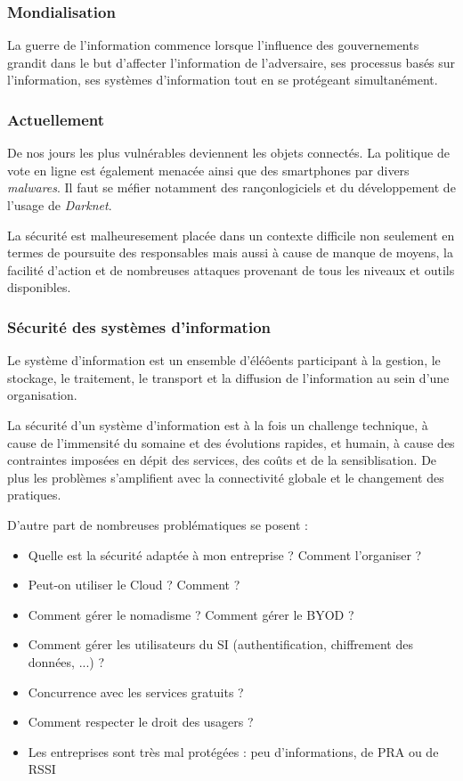 \documentclass[12pt, a4paper]{article}
\begin{document}
	\subsubsection{Mondialisation}
	La guerre de l'information commence lorsque l'influence des gouvernements
	grandit dans le but d'affecter l'information de l'adversaire, ses processus
	basés sur l'information, ses systèmes d'information tout en se protégeant
	simultanément.
	\subsubsection{Actuellement}
	De nos jours les plus vulnérables deviennent les objets connectés. La
	politique de vote en ligne est également menacée ainsi que des smartphones
	par divers \textit{malwares}. Il faut se méfier notamment des rançonlogiciels
	et du développement de l'usage de \textit{Darknet}.
	\par
	La sécurité est malheuresement placée dans un contexte difficile non seulement
	 en termes de poursuite des responsables mais aussi à cause de manque de
	moyens, la facilité d'action et de nombreuses attaques provenant de tous les
	niveaux et outils disponibles.
	\subsubsection{Sécurité des systèmes d'information}
	Le système d'information est un ensemble d'éléôents participant à la gestion,
	le stockage, le traitement, le transport et la diffusion de l'information au
	sein d'une organisation.
	\par
	La sécurité d'un système d'information est à la fois un challenge technique, à
	 cause de l'immensité du somaine et des évolutions rapides, et humain, à cause
  des contraintes imposées en dépit des services, des coûts et de la
	sensiblisation. De plus les problèmes s'amplifient avec la connectivité
	globale et le changement des pratiques.
	\par
	D'autre part de nombreuses problématiques se posent :
	\begin{itemize}
		\item Quelle est la sécurité adaptée à mon entreprise ? Comment l'organiser
		?
		\item Peut-on utiliser le Cloud ? Comment ?
		\item Comment gérer le nomadisme ? Comment gérer le BYOD ?
		\item Comment gérer les utilisateurs du SI (authentification, chiffrement
		des données, ...) ?
		\item Concurrence avec les services gratuits ?
		\item Comment respecter le droit des usagers ?
		\item Les entreprises sont très mal protégées : peu d'informations, de PRA
		ou de RSSI
	\end{itemize}
\end{document}
